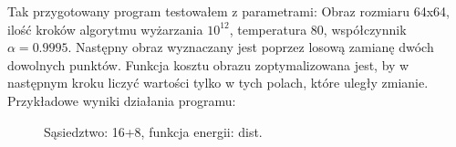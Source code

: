 \documentclass{article}
\begin{document}
        Tak przygotowany program testowałem z parametrami: Obraz rozmiaru 64x64, ilość kroków algorytmu wyżarzania $10^{12}$, temperatura 80, współczynnik $\alpha = 0.9995$. Następny obraz wyznaczany jest poprzez losową zamianę dwóch dowolnych punktów. Funkcja kosztu obrazu zoptymalizowana jest, by w następnym kroku liczyć wartości tylko w tych polach, które uległy zmianie.\\
        Przykładowe wyniki działania programu: 
        \begin{figure}[h!]
            \centering
            \caption{Sąsiedztwo: 16+8, funkcja energii: dist.}
        \end{figure}\\
\end{document}
